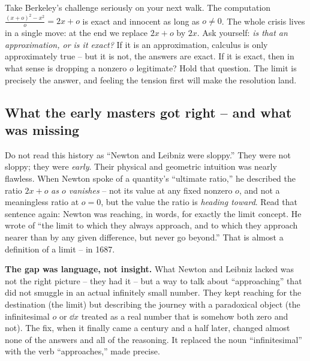 \begin{walkbox}
Take Berkeley's challenge seriously on your next walk. The computation $\frac{(x+o)^2-x^2}{o} =
2x + o$ is exact and innocent as long as $o\neq 0$. The whole crisis lives in a single move: at
the end we replace $2x + o$ by $2x$. Ask yourself: \emph{is that an approximation, or is it
exact?} If it is an approximation, calculus is only approximately true -- but it is not, the
answers are exact. If it is exact, then in what sense is dropping a nonzero $o$ legitimate? Hold
that question. The limit is precisely the answer, and feeling the tension first will make the
resolution land.
\end{walkbox}

\subsection{What the early masters got right -- and what was missing}

Do not read this history as ``Newton and Leibniz were sloppy.'' They were
not sloppy; they were \emph{early}. Their physical and geometric intuition was nearly flawless.
When Newton spoke of a quantity's ``ultimate ratio,'' he described the ratio $2x+o$ \emph{as $o$
vanishes} -- not its value at any fixed nonzero $o$, and not a meaningless ratio at $o=0$, but
the value the ratio is \emph{heading toward}. Read that sentence again: Newton was reaching, in
words, for exactly the limit concept. He wrote of ``the limit to which they always approach, and
to which they approach nearer than by any given difference, but never go beyond.'' That is almost
a definition of a limit -- in 1687.

\begin{historybox}
\textbf{The gap was language, not insight.} What Newton and Leibniz lacked was not the right
picture -- they had it -- but a way to talk about ``approaching'' that did not smuggle in an
actual infinitely small number. They kept reaching for the destination (the limit) but
describing the journey with a paradoxical object (the infinitesimal $o$ or $\dd x$ treated as a
real number that is somehow both zero and not). The fix, when it finally came a century and a
half later, changed almost none of the answers and all of the reasoning. It replaced the noun
``infinitesimal'' with the verb ``approaches,'' made precise.
\end{historybox}

